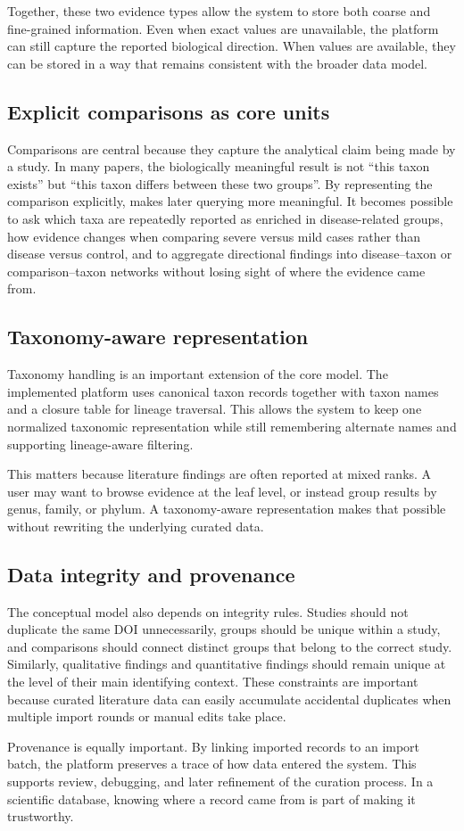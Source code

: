 Together, these two evidence types allow the system to store both coarse and fine-grained information. Even when exact values are unavailable, the platform can still capture the reported biological direction. When values are available, they can be stored in a way that remains consistent with the broader data model.

\subsection{Explicit comparisons as core units}

Comparisons are central because they capture the analytical claim being made by a study. In many papers, the biologically meaningful result is not ``this taxon exists'' but ``this taxon differs between these two groups''. By representing the comparison explicitly, \projectname{} makes later querying more meaningful. It becomes possible to ask which taxa are repeatedly reported as enriched in disease-related groups, how evidence changes when comparing severe versus mild cases rather than disease versus control, and to aggregate directional findings into disease--taxon or comparison--taxon networks without losing sight of where the evidence came from.

\subsection{Taxonomy-aware representation}

Taxonomy handling is an important extension of the core model. The implemented platform uses canonical taxon records together with taxon names and a closure table for lineage traversal. This allows the system to keep one normalized taxonomic representation while still remembering alternate names and supporting lineage-aware filtering.

This matters because literature findings are often reported at mixed ranks. A user may want to browse evidence at the leaf level, or instead group results by genus, family, or phylum. A taxonomy-aware representation makes that possible without rewriting the underlying curated data.

\subsection{Data integrity and provenance}

The conceptual model also depends on integrity rules. Studies should not duplicate the same DOI unnecessarily, groups should be unique within a study, and comparisons should connect distinct groups that belong to the correct study. Similarly, qualitative findings and quantitative findings should remain unique at the level of their main identifying context. These constraints are important because curated literature data can easily accumulate accidental duplicates when multiple import rounds or manual edits take place.

Provenance is equally important. By linking imported records to an import batch, the platform preserves a trace of how data entered the system. This supports review, debugging, and later refinement of the curation process. In a scientific database, knowing where a record came from is part of making it trustworthy.
